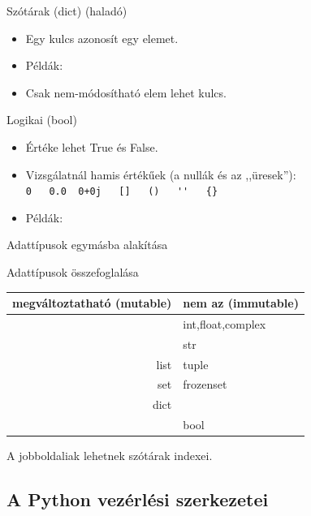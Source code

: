 \begin{frame}[fragile]
  { Szótárak (dict) (haladó)}
  \begin{itemize}
    \item <+-| alert@+> Egy kulcs azonosít egy elemet.
    \item <+-> Példák:
   
    \item <+-> Csak \alert{nem-módosítható elem} lehet kulcs.
  \end{itemize}
\end{frame}

\begin{frame}[fragile]
  {Logikai (bool)}
  \begin{itemize}
    \item <+-| alert@+> Értéke lehet True és False.
    \item <+-| alert@+> Vizsgálatnál hamis értékűek (a nullák és az ,,üresek''):\\
	\verb!0   0.0  0+0j   []   ()   ''   {}!
    \item <+-> Példák:
   
  \end{itemize}
\end{frame}

\begin{frame}
    {Adattípusok egymásba alakítása}

    
\end{frame}

\begin{frame}
    {Adattípusok összefoglalása}

    \begin{tabular}{rl}
	\toprule
	megváltoztatható (mutable)& nem az (immutable)\\
	\midrule
	&int,float,complex\\
	&str\\
	list&tuple\\
	set&frozenset\\
	dict&\\
	&bool\\
	\bottomrule
    \end{tabular}

    A jobboldaliak lehetnek szótárak indexei.
\end{frame}

\subsection[Vezérlési szerkezetek]{A Python vezérlési szerkezetei}


